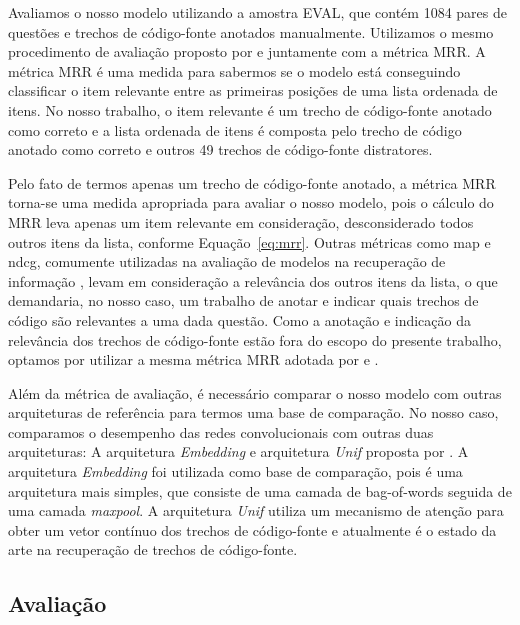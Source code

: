 Avaliamos o nosso modelo utilizando a amostra EVAL, que contém 1084 pares de questões e trechos de código-fonte anotados manualmente. Utilizamos o mesmo procedimento de avaliação proposto por  e  juntamente com a métrica MRR. A métrica MRR é uma medida para sabermos se o modelo está conseguindo classificar o item relevante entre as primeiras posições de uma lista ordenada de itens. 
No nosso trabalho, o item relevante é um trecho de código-fonte anotado como correto e a lista ordenada de itens é composta pelo trecho de código anotado como correto e outros 49 trechos de código-fonte distratores. 

Pelo fato de termos apenas um trecho de código-fonte anotado, a métrica MRR torna-se uma medida apropriada para avaliar o nosso modelo, pois o cálculo do MRR leva apenas um item relevante em consideração, desconsiderado todos outros itens da lista, conforme Equação~\ref{eq:mrr}. Outras métricas como \acrshort{map} e \acrshort{ndcg}, comumente utilizadas na avaliação de modelos na recuperação de informação \cite{kun-learning-to-rank:2018}, levam em consideração a relevância dos outros itens da lista, o que demandaria, no nosso caso, um trabalho de anotar e indicar quais trechos de código são relevantes a uma dada questão. Como a anotação e indicação da relevância dos trechos de código-fonte estão fora do escopo do presente trabalho, optamos por utilizar a mesma métrica MRR adotada por  e .

Além da métrica de avaliação, é necessário comparar o nosso modelo com outras arquiteturas de referência para termos uma base de comparação. No nosso caso, comparamos o desempenho das redes convolucionais com outras duas arquiteturas: A arquitetura \textit{Embedding} e arquitetura \textit{Unif} proposta por . A arquitetura \textit{Embedding} foi utilizada como base de comparação, pois é uma arquitetura mais simples, que consiste de uma camada de \gls{bag-of-words} seguida de uma camada \textit{maxpool}. A arquitetura \textit{Unif} utiliza um mecanismo de atenção para obter um vetor contínuo dos trechos de código-fonte e atualmente é o estado da arte na recuperação de trechos de código-fonte. 



\subsection{Avaliação}
\label{sec:avaliacao}

